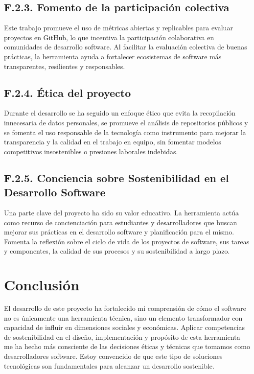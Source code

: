 \subsection{F.2.3. Fomento de la participación colectiva}
Este trabajo promueve el uso de métricas abiertas y replicables para evaluar proyectos en GitHub, lo que incentiva la participación colaborativa en comunidades de desarrollo software. Al facilitar la evaluación colectiva de buenas prácticas, la herramienta ayuda a fortalecer ecosistemas de software más transparentes, resilientes y responsables.

\subsection{F.2.4. Ética del proyecto}
Durante el desarrollo se ha seguido un enfoque ético que evita la recopilación innecesaria de datos personales, se promueve el análisis de repositorios públicos y se fomenta el uso responsable de la tecnología como instrumento para mejorar la transparencia y la calidad en el trabajo en equipo, sin fomentar modelos competitivos insostenibles o presiones laborales indebidas.

\subsection{F.2.5. Conciencia sobre Sostenibilidad en el Desarrollo Software}
Una parte clave del proyecto ha sido su valor educativo. La herramienta actúa como recurso de concienciación para estudiantes y desarrolladores que buscan mejorar sus prácticas en el desarrollo software y planificación para el mismo. Fomenta la reflexión sobre el ciclo de vida de los proyectos de software, sus tareas y componentes, la calidad de sus procesos y su sostenibilidad a largo plazo.

\section{Conclusión}
El desarrollo de este proyecto ha fortalecido mi comprensión de cómo el software no es únicamente una herramienta técnica, sino un elemento transformador con capacidad de influir en dimensiones sociales y económicas. Aplicar competencias de sostenibilidad en el diseño, implementación y propósito de esta herramienta me ha hecho más consciente de las decisiones éticas y técnicas que tomamos como desarrolladores software. Estoy convencido de que este tipo de soluciones tecnológicas son fundamentales para alcanzar un desarrollo sostenible.